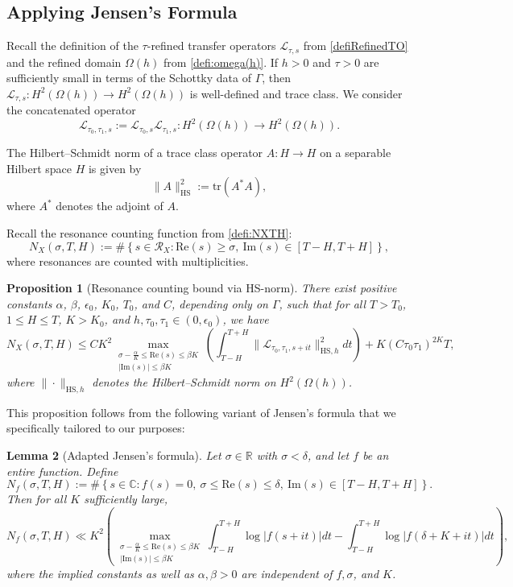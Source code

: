 \documentclass[12pt,letterpaper]{amsart}
\theoremstyle{plain}
\newtheorem{prop}{Proposition}[section]
\newtheorem{lemma}[prop]{Lemma}
\theoremstyle{definition}
\theoremstyle{remark}
\newcommand{\CC}{\mathbb{C}}
\begin{document}
\subsection{Applying Jensen's Formula}\label{sec:jensen}
Recall the definition of the $\tau$-refined transfer operators $\mathcal{L}_{\tau, s}$ from \eqref{defiRefinedTO} and the refined domain $\Omega(h)$ from \eqref{defi:omega(h)}. If $h > 0$ and $\tau > 0$ are sufficiently small in terms of the Schottky data of $\Gamma$, then $\mathcal{L}_{\tau, s} \colon H^2(\Omega(h)) \to H^2(\Omega(h))$ is well-defined and trace class. We consider the concatenated operator
\begin{equation}\label{defConcat}
\mathcal{L}_{\tau_0, \tau_1, s} := \mathcal{L}_{\tau_0, s} \mathcal{L}_{\tau_1, s} \colon H^2(\Omega(h)) \to H^2(\Omega(h)).
\end{equation}

The Hilbert–Schmidt norm of a trace class operator $A \colon H \to H$ on a separable Hilbert space $H$ is given by
\[
\|A\|_{\mathrm{HS}}^2 := \mathrm{tr}(A^\ast A),
\]
where $A^\ast$ denotes the adjoint of $A$.

Recall the resonance counting function from \eqref{defi:NXTH}:
\[
N_X(\sigma, T, H) := \#\left\{ s \in \mathcal{R}_X : \mathrm{Re}(s) \ge \sigma,\ \mathrm{Im}(s) \in [T-H, T+H] \right\},
\]
where resonances are counted with multiplicities.

\begin{prop}[Resonance counting bound via HS-norm]\label{prop:intHSzeros}
There exist positive constants $\alpha$, $\beta$, $\epsilon_0$, $K_0$, $T_0$, and $C$, depending only on $\Gamma$, such that for all $T > T_0$, $1 \le H \le T$, $K > K_0$, and $h, \tau_0, \tau_1 \in (0, \epsilon_0)$, we have
\[
N_X(\sigma, T, H) \le C K^2 \max_{\substack{ \sigma - \frac{\alpha}{K} \le \mathrm{Re}(s) \le \beta K \\ |\mathrm{Im}(s)| \le \beta K }} \left( \int_{T - H}^{T + H} \| \mathcal{L}_{\tau_0, \tau_1, s + it} \|_{\mathrm{HS}, h}^2 dt \right) + K (C \tau_0 \tau_1)^{2K} T,
\]
where $\|\cdot\|_{\mathrm{HS}, h}$ denotes the Hilbert--Schmidt norm on $H^2(\Omega(h))$.
\end{prop}

This proposition follows from the following variant of Jensen's formula that we specifically tailored to our purposes:

\begin{lemma}[Adapted Jensen’s formula]\label{lem:jensenAdapt}
Let $\sigma \in \mathbb{R}$ with $\sigma < \delta$, and let $f$ be an entire function. Define
\[
N_f(\sigma, T, H) := \#\left\{ s \in \CC : f(s) = 0,\ \sigma \le \mathrm{Re}(s) \le \delta,\ \mathrm{Im}(s) \in [T - H, T + H] \right\}.
\]
Then for all $K$ sufficiently large,
\[
N_f(\sigma, T, H) \ll K^2 \left( \max_{\substack{ \sigma - \frac{\alpha}{K} \le \mathrm{Re}(s) \le \beta K \\ |\mathrm{Im}(s)| \le \beta K }} \int_{T - H}^{T + H} \log |f(s + it)| dt - \int_{T - H}^{T + H} \log |f(\delta + K + it)| dt \right),
\]
where the implied constants as well as $\alpha, \beta > 0$ are independent of $f, \sigma$, and $K$.
\end{lemma}
\end{document}
